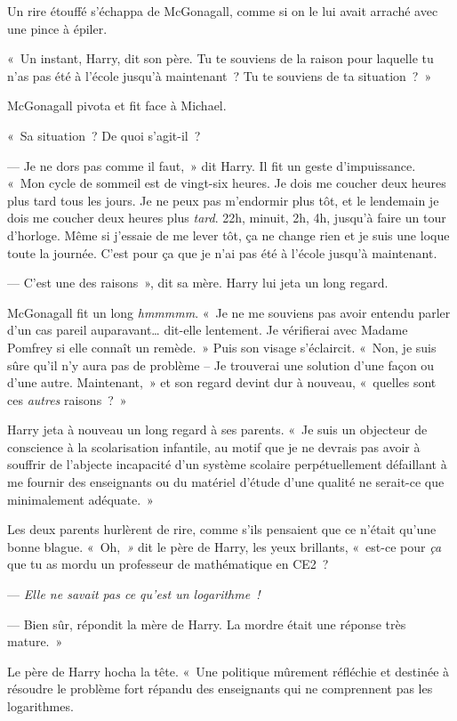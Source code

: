 Un rire étouffé s'échappa de McGonagall, comme si on le lui avait arraché avec une pince à épiler.

«~Un instant, Harry, dit son père. Tu te souviens de la raison pour laquelle tu n'as pas été à l'école jusqu'à maintenant~? Tu te souviens de ta situation~?~»

McGonagall pivota et fit face à Michael.

«~Sa situation~? De quoi s'agit-il~?

--- Je ne dors pas comme il faut,~» dit Harry. Il fit un geste d'impuissance. «~Mon cycle de sommeil est de vingt-six heures. Je dois me coucher deux heures plus tard tous les jours. Je ne peux pas m'endormir plus tôt, et le lendemain je dois me coucher deux heures plus \emph{tard}. 22h, minuit, 2h, 4h, jusqu'à faire un tour d'horloge. Même si j'essaie de me lever tôt, ça ne change rien et je suis une loque toute la journée. C'est pour ça que je n'ai pas été à l'école jusqu'à maintenant.

--- C'est une des raisons~», dit sa mère. Harry lui jeta un long regard.

McGonagall fit un long \emph{hmmmmm}. «~Je ne me souviens pas avoir entendu parler d'un cas pareil auparavant… dit-elle lentement. Je vérifierai avec Madame Pomfrey si elle connaît un remède.~» Puis son visage s'éclaircit. «~Non, je suis sûre qu'il n'y aura pas de problème -- Je trouverai une solution d'une façon ou d'une autre. Maintenant,~» et son regard devint dur à nouveau, «~quelles sont ces \emph{autres} raisons~?~»

Harry jeta à nouveau un long regard à ses parents. «~Je suis un objecteur de conscience à la scolarisation infantile, au motif que je ne devrais pas avoir à souffrir de l'abjecte incapacité d'un système scolaire perpétuellement défaillant à me fournir des enseignants ou du matériel d'étude d'une qualité ne serait-ce que minimalement adéquate.~»

Les deux parents hurlèrent de rire, comme s'ils pensaient que ce n'était qu'une bonne blague. «~Oh,\emph{~»} dit le père de Harry, les yeux brillants, «~est-ce pour \emph{ça} que tu as mordu un professeur de mathématique en CE2~?

--- \emph{Elle ne savait pas ce qu'est un logarithme~!}

--- Bien sûr, répondit la mère de Harry. La mordre était une réponse très mature.~»

Le père de Harry hocha la tête. «~Une politique mûrement réfléchie et destinée à résoudre le problème fort répandu des enseignants qui ne comprennent pas les logarithmes.

